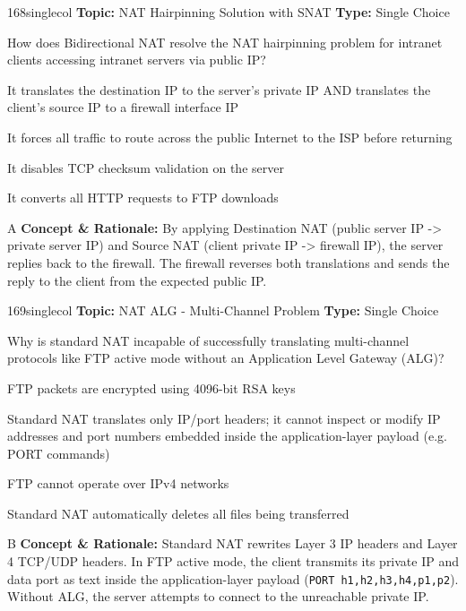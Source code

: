 \begin{qcard}{168}{singlecol}
\textcolor{darkslate!75}{\small\textbf{Topic:} NAT Hairpinning Solution with SNAT \hfill \textbf{Type:} Single Choice}\vspace{0.4em}\par
How does Bidirectional NAT resolve the NAT hairpinning problem for intranet clients accessing intranet servers via public IP?
\begin{qoptions}
\item It translates the destination IP to the server's private IP AND translates the client's source IP to a firewall interface IP
\item It forces all traffic to route across the public Internet to the ISP before returning
\item It disables TCP checksum validation on the server
\item It converts all HTTP requests to FTP downloads
\end{qoptions}
\end{qcard}
\nopagebreak
\begin{explainbox}{A}
\textbf{Concept \& Rationale:} By applying Destination NAT (public server IP -\textgreater{} private server IP) and Source NAT (client private IP -\textgreater{} firewall IP), the server replies back to the firewall. The firewall reverses both translations and sends the reply to the client from the expected public IP.
\end{explainbox}

\begin{qcard}{169}{singlecol}
\textcolor{darkslate!75}{\small\textbf{Topic:} NAT ALG - Multi-Channel Problem \hfill \textbf{Type:} Single Choice}\vspace{0.4em}\par
Why is standard NAT incapable of successfully translating multi-channel protocols like FTP active mode without an Application Level Gateway (ALG)?
\begin{qoptions}
\item FTP packets are encrypted using 4096-bit RSA keys
\item Standard NAT translates only IP/port headers; it cannot inspect or modify IP addresses and port numbers embedded inside the application-layer payload (e.g. PORT commands)
\item FTP cannot operate over IPv4 networks
\item Standard NAT automatically deletes all files being transferred
\end{qoptions}
\end{qcard}
\nopagebreak
\begin{explainbox}{B}
\textbf{Concept \& Rationale:} Standard NAT rewrites Layer 3 IP headers and Layer 4 TCP/UDP headers. In FTP active mode, the client transmits its private IP and data port as text inside the application-layer payload (\texttt{PORT h1,h2,h3,h4,p1,p2}). Without ALG, the server attempts to connect to the unreachable private IP.
\end{explainbox}

